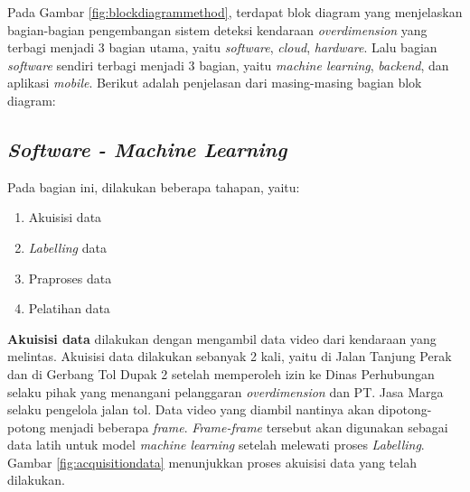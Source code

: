 Pada Gambar \ref{fig:blockdiagrammethod}, terdapat blok diagram yang menjelaskan bagian-bagian pengembangan sistem deteksi kendaraan \emph{overdimension} yang terbagi menjadi 3 bagian utama, yaitu \emph{software}, \emph{cloud}, \emph{hardware}. Lalu bagian \emph{software} sendiri terbagi menjadi 3 bagian, yaitu \emph{machine learning}, \emph{backend}, dan aplikasi \emph{mobile}. Berikut adalah penjelasan dari masing-masing bagian blok diagram:

\subsection{\emph{Software - Machine Learning}}
Pada bagian ini, dilakukan beberapa tahapan, yaitu:
\begin{enumerate}[nolistsep]
  \item Akuisisi data
  \item \emph{Labelling} data
  \item Praproses data
  \item Pelatihan data
\end{enumerate}

\textbf{Akuisisi data} dilakukan dengan mengambil data video dari kendaraan yang melintas. Akuisisi data dilakukan sebanyak 2 kali, yaitu di Jalan Tanjung Perak dan di Gerbang Tol Dupak 2 setelah memperoleh izin ke Dinas Perhubungan selaku pihak yang menangani pelanggaran \emph{overdimension} dan PT. Jasa Marga selaku pengelola jalan tol. Data video yang diambil nantinya akan dipotong-potong menjadi beberapa \emph{frame}. \emph{Frame-frame} tersebut akan digunakan sebagai data latih untuk model \emph{machine learning} setelah melewati proses \emph{Labelling}. Gambar \ref{fig:acquisitiondata} menunjukkan proses akuisisi data yang telah dilakukan.

